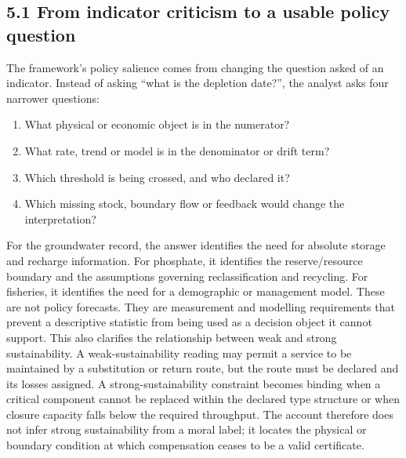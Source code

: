 \documentclass[11pt]{article}
\begin{document}
\subsection{5.1 From indicator criticism to a usable policy question}
The framework's policy salience comes from changing the question asked of an indicator. Instead of asking ``what is the depletion date?'', the analyst asks four narrower questions:
\begin{enumerate}
\item What physical or economic object is in the numerator?
\item What rate, trend or model is in the denominator or drift term?
\item Which threshold is being crossed, and who declared it?
\item Which missing stock, boundary flow or feedback would change the interpretation?
\end{enumerate}
For the groundwater record, the answer identifies the need for absolute storage and recharge information. For phosphate, it identifies the reserve/resource boundary and the assumptions governing reclassification and recycling. For fisheries, it identifies the need for a demographic or management model. These are not policy forecasts. They are measurement and modelling requirements that prevent a descriptive statistic from being used as a decision object it cannot support.
This also clarifies the relationship between weak and strong sustainability. A weak-sustainability reading may permit a service to be maintained by a substitution or return route, but the route must be declared and its losses assigned. A strong-sustainability constraint becomes binding when a critical component cannot be replaced within the declared type structure or when closure capacity falls below the required throughput. The account therefore does not infer strong sustainability from a moral label; it locates the physical or boundary condition at which compensation ceases to be a valid certificate.
\end{document}
